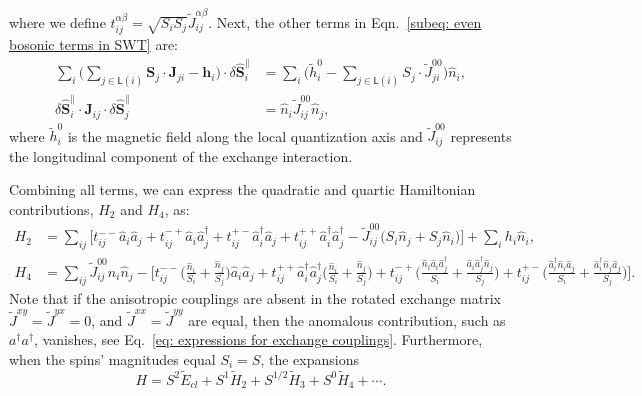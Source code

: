 \documentclass[aps, prx, nofootinbib, superscriptaddress]{revtex4-2}
\begin{document}
where we define $t^{\alpha\beta}_{ij} = \sqrt{S_{i}S_{j}} \widetilde{J}^{\alpha\beta}_{ij}$.
Next, the other terms in Eqn.~\eqref{subeq: even bosonic terms in SWT} are:
\begin{equation}
    \begin{split}
    \sum_{i} \Big( \sum_{j \in \mathsf{L}(i)} \mathbf{S}_{j} \cdot \mathbf{J}_{ji} - \mathbf{h}_{i} \Big) \cdot \delta \hat{\mathbf{S}}_{i}^{\parallel} 
    &= 
    \sum_{i} \Big( \widetilde{h}_{i}^{0} - \sum_{j \in \mathsf{L}(i)} S_{j} \cdot \widetilde{J}_{ji}^{00} \Big)  \hat{n}_{i}, \\
    \delta \hat{\mathbf{S}}_{i}^{\parallel} \cdot \mathbf{J}_{ij} \cdot \delta \hat{\mathbf{S}}_{j}^{\parallel}
    &= \hat{n}_{i} \widetilde{J}_{ij}^{00} \hat{n}_{j},
    \end{split}
\end{equation}
where $\widetilde{h}_{i}^{0}$ is the magnetic field along the local quantization axis and $\widetilde{J}_{ij}^{00}$ represents the longitudinal component of the exchange interaction.

Combining all terms, we can express the quadratic and quartic Hamiltonian contributions, $H_{2}$ and $H_{4}$, as:
\begin{align}
    H_{2} &= \sum_{ij} \Big[ t_{ij}^{--} \hat{a}_{i} \hat{a}_{j} + t_{ij}^{-+} \hat{a}_{i}\hat{a}_{j}^{\dagger} + t_{ij}^{+-} \hat{a}_{i}^{\dagger} \hat{a}_{j} + t_{ij}^{++} \hat{a}^{\dagger}_{i} \hat{a}^{\dagger}_{j} - \widetilde{J}_{ij}^{00} \big( S_{i} \hat{n}_{j} + S_{j} \hat{n}_{i} \big) \Big] + \sum_{i} h_{i} \hat{n}_{i}, 
    \label{eq: SWT bosonic H2 in real space}\\
    H_{4} &= \sum_{ij} \widetilde{J}_{ij}^{00} \hat{n}_{i} \hat{n}_{j} - \Big[ t_{ij}^{--} \big( \tfrac{\hat{n}_{i}}{S_{i}} + \tfrac{\hat{n}_{j}}{S_{j}} \big) \hat{a}_{i} \hat{a}_{j} + t_{ij}^{++} \hat{a}^{\dagger}_{i} \hat{a}^{\dagger}_{j} \big( \tfrac{\hat{n}_{i}}{S_{i}} + \tfrac{\hat{n}_{j}}{S_{j}} \big) + t_{ij}^{-+} \big( \tfrac{\hat{n}_{i} \hat{a}_{i} \hat{a}_{j}^{\dagger}}{S_{i}} + \tfrac{\hat{a}_{i} \hat{a}_{j}^{\dagger} \hat{n}_{j}}{S_{j}} \big) + t_{ij}^{+-} \big( \tfrac{\hat{a}_{i}^{\dagger} \hat{n}_{i} \hat{a}_{j}}{S_{i}} + \tfrac{\hat{a}_{i}^{\dagger} \hat{n}_{j} \hat{a}_{j}}{S_{j}} \big) \Big]. 
    \label{eq: SWT bosonic H4 in real space}
\end{align}
Note that if the anisotropic couplings are absent in the rotated exchange matrix $\widetilde{J}^{xy} = \widetilde{J}^{yx} = 0$, and $\widetilde{J}^{xx} = \widetilde{J}^{yy}$ are equal, then the anomalous contribution, such as $a^{\dagger}a^{\dagger}$, vanishes, see Eq.~\eqref{eq: expressions for exchange couplings}. 
Furthermore, when the spins' magnitudes equal $S_{i} = S$, the expansions 
\begin{equation}
    H = S^{2} \tilde{E}_{cl} + S^{1} \tilde{H}_2 + S^{1/2} \tilde{H}_3 + S^{0} \tilde{H}_4 + \cdots.
\end{equation}
\end{document}
